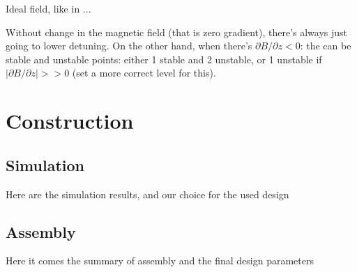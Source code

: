 \documentclass[12pt,a4paper]{article}
\begin{document}
Ideal field, like in \cite{Bell2010}...


Without change in the magnetic field (that is zero gradient), there's always just going to lower detuning. On the other hand, when there's $\partial B/\partial z < 0$: the can be stable and unstable points: either 1 stable and 2 unstable, or 1 unstable if $|\partial B / \partial z| >> 0$ (set a more correct level for this).



\section{Construction}

\subsection{Simulation}

Here are the simulation results, and our choice for the used design

\subsection{Assembly}

Here it comes the summary of assembly and the final design parameters





\end{document}
